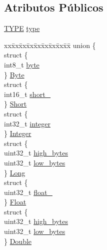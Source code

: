 \subsection*{Atributos Públicos}
\begin{DoxyCompactItemize}
\item 
\hyperlink{core_8h_a96376f31c362e2a289072478449290f8}{T\-Y\-P\-E} \hyperlink{structvalue_a8193b2471a420d07d6273ea3c9653155}{type}
\item 
\begin{tabbing}
xx\=xx\=xx\=xx\=xx\=xx\=xx\=xx\=xx\=\kill
union \{\\
\>struct \{\\
\>\>int8\_t \hyperlink{structvalue_a5827febe7b21adba8ddb86bbf0996e8c}{byte}\\
\>\} \hyperlink{structvalue_af2bea3c5b60d0a36c10e297af2bbb80f}{Byte}\\
\>struct \{\\
\>\>int16\_t \hyperlink{structvalue_a083e8a03606d5b79029794b3d575c021}{short\_}\\
\>\} \hyperlink{structvalue_ac6f6c8288a2314221cd061b264fa25e1}{Short}\\
\>struct \{\\
\>\>int32\_t \hyperlink{structvalue_a58a1dfb88538dd68c4ccd5d6c7f571d2}{integer}\\
\>\} \hyperlink{structvalue_a8f62817042c944120cd6099cc5ec9654}{Integer}\\
\>struct \{\\
\>\>uint32\_t \hyperlink{structvalue_a670628f51376fadc6cd3c7aa2076dd95}{high\_bytes}\\
\>\>uint32\_t \hyperlink{structvalue_a8f7d961af70bd80fe990c31ff3db48fa}{low\_bytes}\\
\>\} \hyperlink{structvalue_a525db6e48cfe9e5303f30ba1dde3cb7f}{Long}\\
\>struct \{\\
\>\>uint32\_t \hyperlink{structvalue_af597140f73eb1550b593c1b98557f6b8}{float\_}\\
\>\} \hyperlink{structvalue_a7a1d7fe0031e83219851bd64b2835ded}{Float}\\
\>struct \{\\
\>\>uint32\_t \hyperlink{structvalue_a670628f51376fadc6cd3c7aa2076dd95}{high\_bytes}\\
\>\>uint32\_t \hyperlink{structvalue_a8f7d961af70bd80fe990c31ff3db48fa}{low\_bytes}\\
\>\} \hyperlink{structvalue_af463045e46ef998b3c1e017651e04411}{Double}\\

\end{tabbing}
\end{DoxyCompactItemize}
